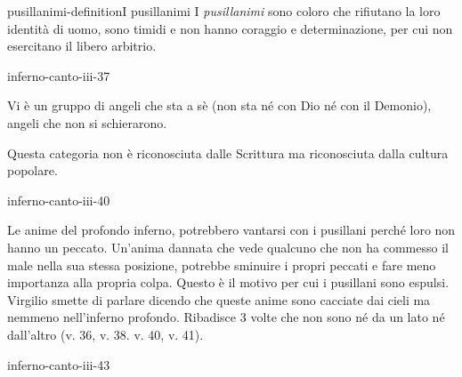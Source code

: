 \documentclass[preview]{standalone}
\begin{document}
\begin{snippetdefinition}{pusillanimi-definition}{I pusillanimi}
    I \textit{pusillanimi} sono coloro che rifiutano la loro identità di uomo,
    sono timidi e non hanno coraggio e determinazione, per cui non esercitano il libero arbitrio.
\end{snippetdefinition}

\begin{snippet}{inferno-canto-iii-37}
    
    Vi è un gruppo di angeli che sta a sè (non sta né con Dio né con il Demonio), angeli che non si schierarono.

    Questa categoria non è riconosciuta dalle Scrittura ma riconosciuta dalla cultura popolare.
\end{snippet}

\begin{snippet}{inferno-canto-iii-40}
    
    Le anime del profondo inferno, potrebbero vantarsi con i pusillani perché loro non hanno un peccato.
    Un'anima dannata che vede qualcuno che non ha commesso il male nella sua stessa posizione,
    potrebbe sminuire i propri peccati e fare meno importanza alla propria colpa.
    Questo è il motivo per cui i pusillani sono espulsi.
    \\
    Virgilio smette di parlare dicendo che queste anime sono cacciate dai cieli
    ma nemmeno nell'inferno profondo. Ribadisce 3 volte che non sono né da un lato né dall'altro
    (v. 36, v. 38. v. 40, v. 41).
\end{snippet}

\begin{snippet}{inferno-canto-iii-43}
\end{snippet}
\end{document}
